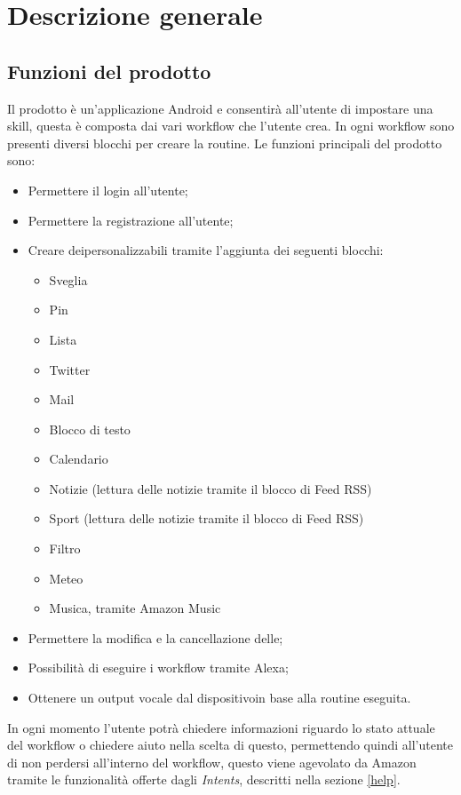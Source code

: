 \chapter{Descrizione generale}

\section{Funzioni del prodotto}
Il prodotto è un'applicazione Android e consentirà all'utente di impostare una skill, questa è composta dai vari workflow che l'utente crea. In ogni workflow sono presenti diversi blocchi per creare la routine. Le funzioni principali del prodotto sono:
\begin{itemize}
	\item Permettere il login all'utente;
	\item Permettere la registrazione all'utente;
	\item Creare deipersonalizzabili tramite l'aggiunta dei seguenti blocchi:
	\begin{itemize}
		\item Sveglia
		\item Pin
		\item Lista
		\item Twitter
		\item Mail
		\item Blocco di testo
		\item Calendario
		\item Notizie (lettura delle notizie tramite il blocco di Feed RSS)
		\item Sport (lettura delle notizie tramite il blocco di Feed RSS)
		\item Filtro
		\item Meteo
		\item Musica, tramite Amazon Music 
	\end{itemize}
	\item Permettere la modifica e la cancellazione delle;
	\item Possibilità di eseguire i workflow tramite Alexa;
	\item Ottenere un output vocale dal dispositivoin base alla routine eseguita.
\end{itemize}
In ogni momento l'utente potrà chiedere informazioni riguardo lo stato attuale del workflow o chiedere aiuto nella scelta di questo, permettendo quindi all'utente di non perdersi all'interno del workflow, questo viene agevolato da Amazon tramite le funzionalità offerte dagli \textit{Intents}, descritti nella sezione \ref{help}.

